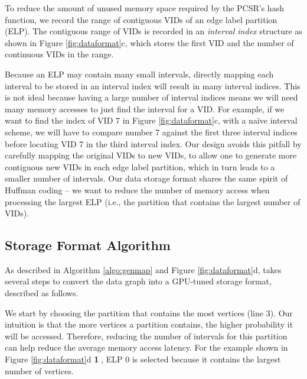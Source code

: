To reduce the amount of unused memory space required by the PCSR's hash function, we record the range of contiguous VIDs of an edge label
partition (ELP). The contiguous range of VIDs is recorded in an \emph{interval index} structure as shown in Figure \ref{fig:dataformat}c,
which stores the first VID and the number of continuous VIDs in the range.

Because an ELP may contain many small intervals, directly mapping each interval to be stored in an interval index will result in many
interval indices. This is not ideal because having a large number of interval indices means we will need many memory accesses to just find
the interval for a VID. For example, if we want to find the index of VID 7 in Figure \ref{fig:dataformat}c, with a naïve interval scheme,
we will have to compare number 7 against the first three interval indices before locating VID 7 in the third interval index. Our design
avoids this pitfall by carefully mapping the original VIDs to new VIDs, to allow one to generate more contiguous new VIDs in each edge
label partition, which in turn leads to a smaller number of intervals. Our data storage format shares the same spirit of Huffman coding \cite{Moffat2019Huffman} – we want to reduce the number of memory access when processing the largest ELP (i.e., the partition that contains the largest number of VIDs).

\subsection{\SystemName Storage Format Algorithm}

 As described in Algorithm \ref{algo:genmap} and Figure \ref{fig:dataformat}d, \SystemName takes several steps to convert the data graph into a GPU-tuned storage format, described as follows.

 We start by choosing the partition that contains the most vertices (line 3). Our intuition is that the more vertices a partition contains, the higher probability it will be accessed. Therefore, reducing the number of intervals for this partition can help reduce the average memory access latency. For the example shown in Figure
\ref{fig:dataformat}d \textbf{\textcircled{1}}, ELP 0 is selected because it contains the largest number of vertices.

